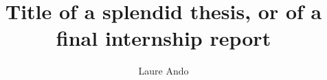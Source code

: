 \documentclass[12pt, a4paper, oneside]{book}
\title{Title of a splendid thesis, or of a final internship report}
\author{Laure Ando}
\begin{document}
\frontmatter
\maketitle





\tableofcontents
\listoffigures
\listoftables
\listofalgorithms


\mainmatter






\appendix


\printthesisbibliography
\end{document}
